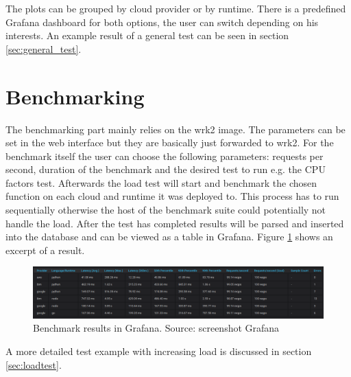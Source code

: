 The plots can be grouped by cloud provider or by runtime. There is a predefined Grafana dashboard for both options, the user can switch depending on his interests. An example result of a general test can be seen in section \ref{sec:general_test}.


\section{Benchmarking}
The benchmarking part mainly relies on the wrk2 image. The parameters can be set in the web interface but they are basically just forwarded to wrk2. For the benchmark itself the user can choose the following parameters: requests per second, duration of the benchmark and the desired test to run e.g. the \gls{CPU} factors test. Afterwards the load test will start and benchmark the chosen function on each cloud and runtime it was deployed to. This process has to run sequentially otherwise the host of the benchmark suite could potentially not handle the load. After the test has completed results will be parsed and inserted into the database and can be viewed as a table in Grafana. Figure \ref{fig:benchmark_table} shows an excerpt of a result.

\begin{figure}[htp]
\begin{center}
\includegraphics[width=1\textwidth]{bilder/benchmark_table.png}
\captionsetup{justification=centering, labelfont=bf}
\caption[Benchmark results in Grafana]{Benchmark results in Grafana. Source: screenshot Grafana}
\label{fig:benchmark_table}
\end{center}
\end{figure}

A more detailed test example with increasing load is discussed in section \ref{sec:loadtest}.

